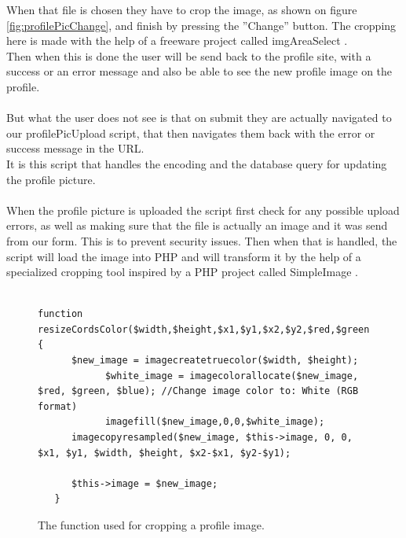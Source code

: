 When that file is chosen they have to crop the image, as shown on figure \ref{fig:profilePicChange}, and finish by pressing the ''Change'' button.
The cropping here is made with the help of a freeware project called imgAreaSelect \citep{imgAreaSelect}.\\
Then when this is done the user will be send back to the profile site, with a success or an error message and also be able to see the new profile image on the profile.\\
\\
But what the user does not see is that on submit they are actually navigated to our profilePicUpload script, that then navigates them back with the error or success message in the URL.\\
It is this script that handles the encoding and the database query for updating the profile picture.\\
\\
When the profile picture is uploaded the script first check for any possible upload errors, as well as making sure that the file is actually an image and it was send from our form. This is to prevent security issues.
Then when that is handled, the script will load the image into PHP and will transform it by the help of a specialized cropping tool inspired by a PHP project called SimpleImage \citep{simpleimage}.\\
\\

\lstset{language=PHP}
\begin{figure}[htbp]
\begin{lstlisting}[firstline=1]
   function resizeCordsColor($width,$height,$x1,$y1,$x2,$y2,$red,$green,$blue) {
      $new_image = imagecreatetruecolor($width, $height);
			$white_image = imagecolorallocate($new_image, $red, $green, $blue); //Change image color to: White (RGB format)
			imagefill($new_image,0,0,$white_image);
      imagecopyresampled($new_image, $this->image, 0, 0, $x1, $y1, $width, $height, $x2-$x1, $y2-$y1);
	  
      $this->image = $new_image;
   }
\end{lstlisting}
\caption{The function used for cropping a profile image.}
\label{lst:croppingProfile}
\end{figure}

